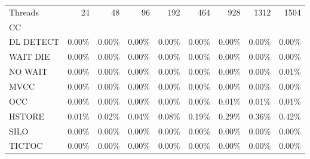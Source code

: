 \begin{tabular}{lrrrrrrrr}
\toprule
Threads &  24   &  48   &  96   &  192  &  464  &  928  &  1312 &  1504 \\
CC        &       &       &       &       &       &       &       &       \\
\midrule
DL DETECT & 0.00\% & 0.00\% & 0.00\% & 0.00\% & 0.00\% & 0.00\% & 0.00\% & 0.00\% \\
WAIT DIE  & 0.00\% & 0.00\% & 0.00\% & 0.00\% & 0.00\% & 0.00\% & 0.00\% & 0.00\% \\
NO WAIT   & 0.00\% & 0.00\% & 0.00\% & 0.00\% & 0.00\% & 0.00\% & 0.00\% & 0.01\% \\
MVCC      & 0.00\% & 0.00\% & 0.00\% & 0.00\% & 0.00\% & 0.00\% & 0.00\% & 0.00\% \\
OCC       & 0.00\% & 0.00\% & 0.00\% & 0.00\% & 0.00\% & 0.01\% & 0.01\% & 0.01\% \\
HSTORE    & 0.01\% & 0.02\% & 0.04\% & 0.08\% & 0.19\% & 0.29\% & 0.36\% & 0.42\% \\
SILO      & 0.00\% & 0.00\% & 0.00\% & 0.00\% & 0.00\% & 0.00\% & 0.00\% & 0.00\% \\
TICTOC    & 0.00\% & 0.00\% & 0.00\% & 0.00\% & 0.00\% & 0.00\% & 0.00\% & 0.00\% \\
\bottomrule
\end{tabular}

